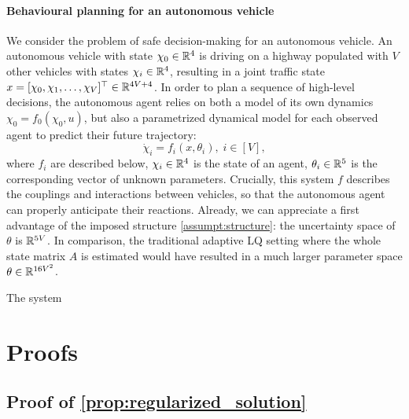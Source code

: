 \documentclass{article}
\begin{document}
\paragraph{Behavioural planning for an autonomous vehicle}
We consider the problem of safe decision-making for an autonomous vehicle. An autonomous vehicle with state $\chi_0\in\mathbb{R}^4$ is driving on a highway populated with $V$ other vehicles with states $\chi_i\in\mathbb{R}^4$, resulting in a joint traffic state $x = [\chi_0, \chi_1,\dots,\chi_V]^\top\in\mathbb{R}^{4V+4}$. In order to plan a sequence of high-level decisions, the autonomous agent relies on both a model of its own dynamics $\chi_0 = f_0(\chi_0,u)$, but also a parametrized dynamical model for each observed agent to predict their future trajectory: \[\dot{\chi}_i=f_i(x,\theta_i),\;i\in[V],\] where $f_i$ are described below, $\chi_i\in\mathbb{R}^4$ is the state of an agent, $\theta_i\in\mathbb{R}^5$ is the corresponding vector of unknown parameters. Crucially, this system $f$ describes the couplings and interactions between vehicles, so that the autonomous agent can properly anticipate their reactions. 
Already, we can appreciate a first advantage of the imposed structure \autoref{assumpt:structure}: the uncertainty space of $\theta$ is $\mathbb{R}^{5V}$. In comparison, the traditional adaptive LQ setting where the whole state matrix $A$ is estimated would have resulted in a much larger parameter space $\theta\in\mathbb{R}^{16V^2}$.

The system 





\clearpage
\appendix

\section{Proofs}

\subsection{Proof of \autoref{prop:regularized_solution}}
\end{document}
